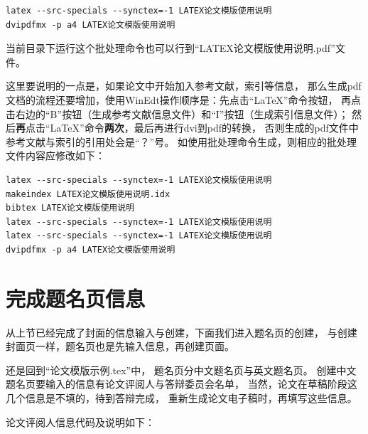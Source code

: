 {\linespread{1}
\begin{verbatim}
latex --src-specials --synctex=-1 LATEX论文模版使用说明
dvipdfmx -p a4 LATEX论文模版使用说明
\end{verbatim}
}
\vspace{4mm}

当前目录下运行这个批处理命令也可以行到“LATEX论文模版使用说明.pdf”文件。

这里要说明的一点是，如果论文中开始加入参考文献，索引等信息，
那么生成pdf文档的流程还要增加，使用WinEdt操作顺序是：先点击“LaTeX”命令按钮，
再点击右边的“B”按钮（生成参考文献信息文件）和“I”按钮（生成索引信息文件）；
然后{\bfseries 再}点击“LaTeX”命令{\bfseries 两次}，最后再进行dvi到pdf的转换，
否则生成的pdf文件中参考文献与索引的引用处会是“？”号。
如使用批处理命令生成，则相应的批处理文件内容应修改如下：

{\linespread{1}
\begin{verbatim}
latex --src-specials --synctex=-1 LATEX论文模版使用说明
makeindex LATEX论文模版使用说明.idx
bibtex LATEX论文模版使用说明
latex --src-specials --synctex=-1 LATEX论文模版使用说明
latex --src-specials --synctex=-1 LATEX论文模版使用说明
dvipdfmx -p a4 LATEX论文模版使用说明
\end{verbatim}
}
\vspace{4mm}

\section{完成题名页信息}

从上节已经完成了封面的信息输入与创建，下面我们进入题名页的创建，
与创建封面页一样，题名页也是先输入信息，再创建页面。

还是回到“论文模版示例.tex”中，
题名页分中文题名页与英文题名页。
创建中文题名页要输入的信息有论文评阅人与答辩委员会名单，
当然，论文在草稿阶段这几个信息是不填的，待到答辩完成，
重新生成论文电子稿时，再填写这些信息。

论文评阅人信息代码及说明如下：

